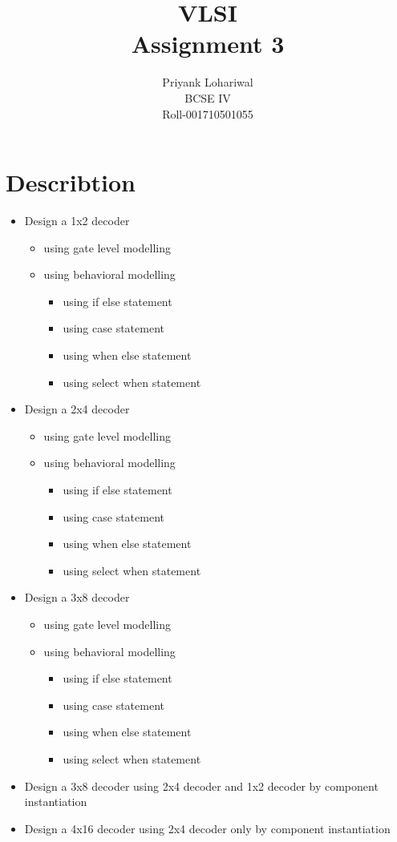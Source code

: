 \documentclass[titlepage]{article}
\title{VLSI \\Assignment 3}
\author{Priyank Lohariwal\\BCSE IV\\Roll-001710501055}
\date{}
\begin{document}
    {\maketitle}

    \section{Describtion}
    \begin{itemize}
        \item Design a 1x2 decoder
        \begin{itemize}
            \item using gate level modelling
            \item using behavioral modelling
            \begin{itemize}
                \item using if else statement
                \item using case statement
                \item using when else statement
                \item using select when statement
            \end{itemize}
        \end{itemize}
        \item Design a 2x4 decoder 
        \begin{itemize}
            \item using gate level modelling
            \item using behavioral modelling
            \begin{itemize}
                \item using if else statement
                \item using case statement
                \item using when else statement
                \item using select when statement
            \end{itemize}
        \end{itemize}
        \item Design a 3x8 decoder
        \begin{itemize}
            \item using gate level modelling
            \item using behavioral modelling
            \begin{itemize}
                \item using if else statement
                \item using case statement
                \item using when else statement
                \item using select when statement
            \end{itemize}
        \end{itemize}
        \item Design a 3x8 decoder using 2x4 decoder and 1x2 decoder by component instantiation
        \item Design a 4x16 decoder using 2x4 decoder only by component instantiation
    \end{itemize}
\end{document}
